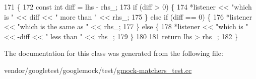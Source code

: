 \begin{DoxyCode}
171                                                                     \{
172     \textcolor{keyword}{const} \textcolor{keywordtype}{int} diff = lhs - rhs\_;
173     \textcolor{keywordflow}{if} (diff > 0) \{
174       *listener << \textcolor{stringliteral}{"which is "} << diff << \textcolor{stringliteral}{" more than "} << rhs\_;
175     \} \textcolor{keywordflow}{else} \textcolor{keywordflow}{if} (diff == 0) \{
176       *listener << \textcolor{stringliteral}{"which is the same as "} << rhs\_;
177     \} \textcolor{keywordflow}{else} \{
178       *listener << \textcolor{stringliteral}{"which is "} << -diff << \textcolor{stringliteral}{" less than "} << rhs\_;
179     \}
180 
181     \textcolor{keywordflow}{return} lhs > rhs\_;
182   \}
\end{DoxyCode}


The documentation for this class was generated from the following file\+:\begin{DoxyCompactItemize}
\item 
vendor/googletest/googlemock/test/\hyperlink{gmock-matchers__test_8cc}{gmock-\/matchers\+\_\+test.\+cc}\end{DoxyCompactItemize}
